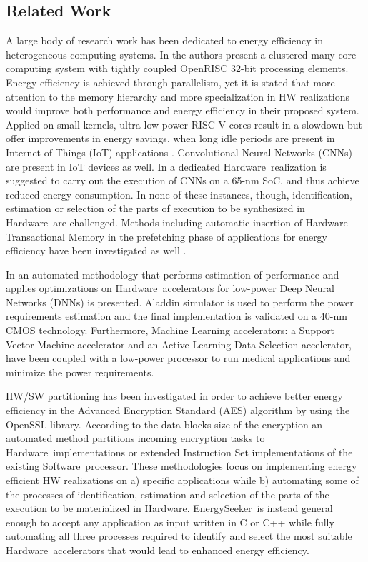 \documentclass[]{usiinfthesis}
\newcommand{\eseeker}{{EnergySeeker}}
\newcommand{\HW}{{Hardware}}
\newcommand{\SW}{{Software}}
\begin{document}
\subsection{Related Work}

A large body of research work has been dedicated to energy efficiency in heterogeneous computing
systems. In \cite{MelpignanoJune12} \cite{ContiSep16} the authors present a clustered many-core 
computing system with tightly coupled OpenRISC 32-bit processing elements. Energy efficiency is 
achieved through parallelism, yet it is stated that more attention to the memory hierarchy and 
more specialization in HW realizations would improve both performance and energy efficiency in 
their proposed system. Applied on small kernels, ultra-low-power RISC-V cores result in a slowdown 
but offer improvements in energy savings, when long idle periods are present in Internet of 
Things (IoT) applications \cite{SchiavoneSep17}. Convolutional Neural Networks (CNNs) are 
present in IoT devices as well. In \cite{PulliniJan17} a dedicated \HW\ realization is 
suggested to carry out the execution of CNNs on a 65-nm SoC, and thus achieve reduced energy
consumption. In none of these instances, though, identification, estimation or selection of
the parts of execution to be synthesized in \HW\ are challenged. Methods including automatic
insertion of Hardware Transactional Memory in the prefetching phase of applications for
energy efficiency have been investigated as well \cite{ZacharopoulosMay15}.\par

In \cite{ReagenJun16} an automated methodology that performs estimation of performance and 
applies optimizations on \HW\ accelerators for low-power Deep Neural Networks (DNNs) is presented. 
Aladdin simulator \cite{ShaoJul14} is used to perform the power requirements estimation and the 
final implementation is validated on a 40-nm CMOS technology. Furthermore, Machine Learning 
accelerators: a Support Vector Machine accelerator and an Active Learning Data Selection 
accelerator, have been coupled with a low-power processor \cite{LeeApr13} to run medical
applications and minimize the power requirements.\par

HW/SW partitioning has been investigated \cite{XiaoMay18} in order to achieve better 
energy efficiency in the Advanced Encryption Standard (AES) algorithm by using the OpenSSL 
\cite{OpensslDec98} library. According to the data blocks size of the encryption an automated 
method partitions incoming encryption tasks to \HW\ implementations or extended Instruction Set 
implementations of the existing \SW\ processor. These methodologies focus on implementing 
energy efficient HW realizations on a) specific applications while b) automating some of the 
processes of identification, estimation and selection of the parts of the execution to be 
materialized in \HW. \eseeker\ is instead general enough to accept any application as 
input written in C or C++ while fully automating all three processes required to identify and 
select the most suitable \HW\ accelerators that would lead to enhanced energy efficiency.\par
\end{document}
